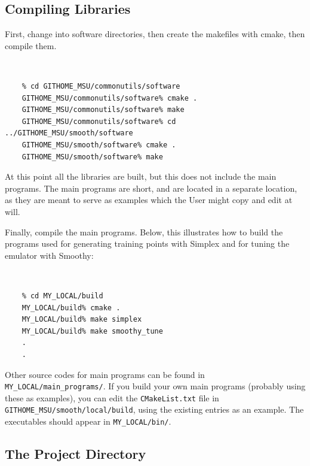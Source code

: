 \documentclass[UserManual.tex]{subfiles}
\begin{document}
\subsection{Compiling Libraries }

First, change into software directories, then create the makefiles with cmake, then compile them.
{\tt 
\begin{verbatim}
    % cd GITHOME_MSU/commonutils/software
    GITHOME_MSU/commonutils/software% cmake .
    GITHOME_MSU/commonutils/software% make
    GITHOME_MSU/commonutils/software% cd ../GITHOME_MSU/smooth/software
    GITHOME_MSU/smooth/software% cmake .
    GITHOME_MSU/smooth/software% make
\end{verbatim}
}
At this point all the libraries are built, but this does not include the main programs. The main programs are short, and are located in a separate location, as they are meant to serve as examples which the User might copy and edit at will.

Finally, compile the main programs. Below, this illustrates how to build the programs used for generating training points with Simplex and for tuning the emulator with Smoothy:
{\tt
\begin{verbatim}
    % cd MY_LOCAL/build
    MY_LOCAL/build% cmake .
    MY_LOCAL/build% make simplex
    MY_LOCAL/build% make smoothy_tune
    .
    .
\end{verbatim}
}
Other source codes for main programs can be found in {\tt MY\_LOCAL/main\_programs/}. If you build your own main programs (probably using these as examples), you can edit the {\tt CMakeList.txt} file in {\tt GITHOME\_MSU/smooth/local/build}, using the existing entries as an example. The executables should appear in {\tt MY\_LOCAL/bin/}. 

\subsection{The Project Directory}
\end{document}
